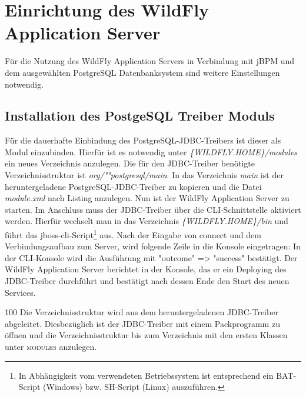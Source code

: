 \section{Einrichtung des WildFly Application Server}
Für die Nutzung des WildFly Application Servers in Verbindung mit jBPM und dem ausgewählten PostgreSQL Datenbanksystem sind weitere Einstellungen notwendig.

\subsection{Installation des PostgeSQL Treiber Moduls}
Für die dauerhafte Einbindung des PostgreSQL-JDBC-Treibers ist dieser als Modul einzubinden. Hierfür ist es notwendig unter \emph{\{WILDFLY.HOME\}/modules} ein neues Verzeichnis anzulegen. Die für den JDBC-Treiber benötigte Verzeichnisstruktur ist \emph{org/""postgresql/main}. In das Verzeichnis \emph{main} ist der heruntergeladene PostgreSQL-JDBC-Treiber zu kopieren und die Datei \emph{module.xml} nach Listing  anzulegen. Nun ist der WildFly Application Server zu starten.
Im Anschluss muss der JDBC-Treiber über die CLI-Schnittstelle aktiviert werden. Hierfür wechselt man in das Verzeichnis \emph{\{WILDFLY.HOME\}/bin} und führt das jboss-cli-Script\footnote{In Abhängigkeit vom verwendeten Betriebssystem ist entsprechend ein BAT-Script (Windows) bzw. SH-Script (Linux) auszuführen.} aus.
Nach der Eingabe von {\ttfamily connect} und dem Verbindungsaufbau zum Server, wird folgende Zeile in die Konsole eingetragen: 
In der CLI-Konsole wird die Ausführung mit {\ttfamily "{}outcome"{} => "{}success"{}} bestätigt. Der WildFly Application Server berichtet in der Konsole, das er ein {\ttfamily Deploying} des JDBC-Treiber durchführt und bestätigt nach dessen Ende den Start des neuen Services.
\begin{info}{100}
	Die Verzeichnisstruktur wird aus dem heruntergeladenen JDBC-Treiber abgeleitet. Diesbezüglich ist der JDBC-Treiber mit einem Packprogramm zu öffnen und die Verzeichnisstruktur bis zum Verzeichnis mit den ersten Klassen unter \textsc{modules} anzulegen.
\end{info}